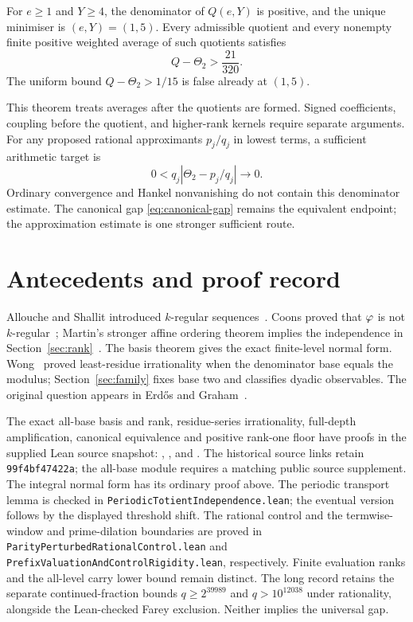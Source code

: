 \documentclass[11pt]{article}
\renewcommand{\commitshort}{99f4bf47422a}
\begin{document}
\begin{theorem}\label{res:rankonefloor}
For $e\ge1$ and $Y\ge4$, the denominator of $Q(e,Y)$ is positive, and the
unique minimiser is $(e,Y)=(1,5)$. Every admissible quotient and every
nonempty finite positive weighted average of such quotients satisfies
\[
 Q-\Theta_2>\frac{21}{320}.
\]
The uniform bound $Q-\Theta_2>1/15$ is false already at $(1,5)$.
\end{theorem}
This theorem treats averages after the quotients are formed. Signed
coefficients, coupling before the quotient, and higher-rank kernels require
separate arguments. For any proposed rational approximants $p_j/q_j$ in
lowest terms, a sufficient arithmetic target is
\[
 0<q_j\left|\Theta_2-p_j/q_j\right|\longrightarrow0.
\]
Ordinary convergence and Hankel nonvanishing do not contain this denominator
estimate. The canonical gap \eqref{eq:canonical-gap} remains the equivalent
endpoint; the approximation estimate is one stronger sufficient route.

\section{Antecedents and proof record}\label{sec:open}
Allouche and Shallit introduced $k$-regular sequences~\cite{allouche-shallit}.
Coons proved that $\varphi$ is not $k$-regular~\cite{coons}; Martin's stronger
affine ordering theorem implies the independence in
Section~\ref{sec:rank}~\cite{martin-phi-inequalities}. The basis theorem
gives the exact finite-level normal form. Wong~\cite{wong2015} proved
least-residue irrationality when the denominator base equals the modulus;
Section~\ref{sec:family} fixes base two and classifies dyadic observables.
The original question appears in Erd\H{o}s and Graham~\cite[p.~61]{erdosgraham1980}.

The exact all-base basis and rank, residue-series irrationality, full-depth
amplification, canonical equivalence and positive rank-one floor have
proofs in the supplied Lean source snapshot:
,
, and
.
The historical source links retain \texttt{\commitshort}; the all-base
module requires a matching public source supplement.
The integral normal form has its ordinary proof above. The periodic transport
lemma is checked in \texttt{PeriodicTotientIndependence.lean}; the eventual
version follows by the displayed threshold shift. The rational control and
the termwise-window and prime-dilation boundaries are proved in
\texttt{ParityPerturbedRationalControl.lean} and
\texttt{PrefixValuationAndControlRigidity.lean}, respectively.
Finite evaluation ranks and the all-level carry lower bound remain distinct.
The long record retains the separate continued-fraction bounds
$q\ge2^{39989}$ and $q>10^{12038}$ under rationality, alongside the
Lean-checked Farey exclusion. Neither implies the universal gap.
\appendix
\end{document}

